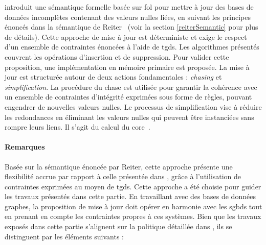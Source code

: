 \cite{chabinConsistentUpdatingDatabases2020} introduit une sémantique formelle basée sur \gls{fol} pour mettre à jour des bases de données incomplètes contenant des valeurs nulles liées, en suivant les principes énoncés dans la sémantique de Reiter~\cite{reiterSoundSometimesComplete1986} (voir la section \ref{reiterSemantic} pour plus de détails).
Cette approche de mise à jour est déterministe et exige le respect d'un ensemble de contraintes énoncées à l'aide de \glspl{tgd}.
Les algorithmes présentés couvrent les opérations d'insertion et de suppression.
Pour valider cette proposition, une implémentation en mémoire primaire est proposée.
La mise à jour est structurée autour de deux actions fondamentales : \emph{chasing} et \emph{simplification}.
La procédure du \gls{chase} est utilisée pour garantir la cohérence avec un ensemble de contraintes d'intégrité exprimées sous forme de règles, pouvant engendrer de nouvelles valeurs nulles.
Le processus de simplification vise à réduire les redondances en éliminant les valeurs nulles qui peuvent être instanciées sans rompre leurs liens.
Il s'agit du calcul du \gls{core}~\cite{faginDataExchangeGetting2005}.


\paragraph{Remarques}
Basée sur la sémantique énoncée par Reiter, cette approche présente une flexibilité accrue par rapport à celle présentée dans \cite{chabinUsingGraphGrammar2019}, grâce à l'utilisation de contraintes exprimées au moyen de \glspl{tgd}.
Cette approche a été choisie pour guider les travaux présentés dans cette partie.
En travaillant avec des bases de données graphes, la proposition de mise à jour doit opérer en harmonie avec les \glspl{sgbd} tout en prenant en compte les contraintes propres à ces systèmes.
Bien que les travaux exposés dans cette partie s'alignent sur la politique détaillée dans \cite{chabinConsistentUpdatingDatabases2020}, ils se distinguent par les éléments suivants :

